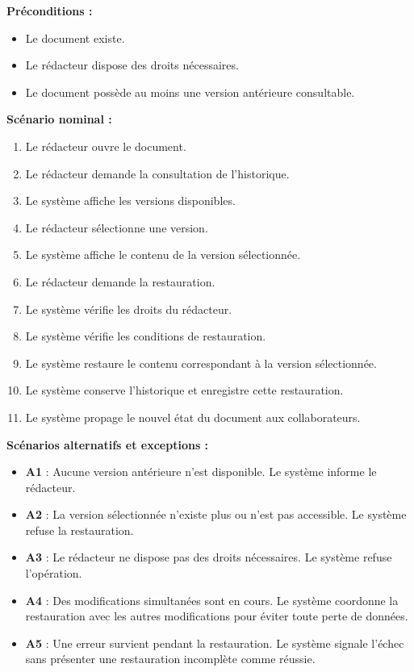 \begin{description}[leftmargin=0pt, style=nextline, font=\normalfont\bfseries\color{violetprincipal}]
    \textbf{Préconditions :}
    \begin{itemize}
        \item Le document existe.
        \item Le rédacteur dispose des droits nécessaires.
        \item Le document possède au moins une version antérieure consultable.
    \end{itemize}

    \textbf{Scénario nominal :}
    \begin{enumerate}
        \item Le rédacteur ouvre le document.
        \item Le rédacteur demande la consultation de l'historique.
        \item Le système affiche les versions disponibles.
        \item Le rédacteur sélectionne une version.
        \item Le système affiche le contenu de la version sélectionnée.
        \item Le rédacteur demande la restauration.
        \item Le système vérifie les droits du rédacteur.
        \item Le système vérifie les conditions de restauration.
        \item Le système restaure le contenu correspondant à la version sélectionnée.
        \item Le système conserve l'historique et enregistre cette restauration.
        \item Le système propage le nouvel état du document aux collaborateurs.
    \end{enumerate}

    \textbf{Scénarios alternatifs et exceptions :}
    \begin{itemize}
        \item \textbf{A1} : Aucune version antérieure n'est disponible. Le système informe le rédacteur.
        \item \textbf{A2} : La version sélectionnée n'existe plus ou n'est pas accessible. Le système refuse la restauration.
        \item \textbf{A3} : Le rédacteur ne dispose pas des droits nécessaires. Le système refuse l'opération.
        \item \textbf{A4} : Des modifications simultanées sont en cours. Le système coordonne la restauration avec les autres modifications pour éviter toute perte de données.
        \item \textbf{A5} : Une erreur survient pendant la restauration. Le système signale l'échec sans présenter une restauration incomplète comme réussie.
    \end{itemize}


\end{description}
